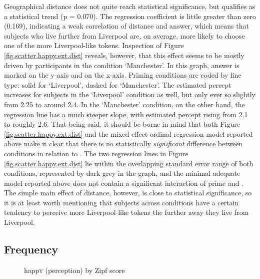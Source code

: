 Geographical distance does not quite reach statistical significance, but qualifies as a statistical trend (p = 0.070).
The regression coefficient is little greater than zero (0.169), indicating a weak correlation of distance and answer, which means that subjects who live further from Liverpool are, on average, more likely to choose one of the more Liverpool-like tokens.
Inspection of Figure \ref{fig.scatter.happy.ext.dist} reveals, however, that this effect seems to be mostly driven by participants in the  condition `Manchester'.
In this graph, answer is marked on the y-axis and  on the x-axis.
Priming conditions are coded by line type: solid for `Liverpool', dashed for `Manchester'.
The estimated percept increases for subjects in the `Liverpool' condition as well, but only ever so slightly from 2.25 to around 2.4.
In the `Manchester' condition, on the other hand, the regression line has a much steeper slope, with estimated percept rising from 2.1 to roughly 2.6.
That being said, it should be borne in mind that both Figure \ref{fig.scatter.happy.ext.dist} and the mixed effect ordinal regression model reported above make it clear that there is no statistically \emph{significant} difference between  conditions in relation to .
The two regression lines in Figure \ref{fig.scatter.happy.ext.dist} lie within the overlapping standard error range of both conditions, represented by dark grey in the graph, and the minimal adequate model reported above does not contain a significant interaction of prime and .
The simple main effect of distance, however, is close to statistical significance, so it is at least worth mentioning that subjects across conditions have a certain tendency to perceive more Liverpool-like tokens the further away they live from Liverpool.

\subsection{Frequency}
\label{sec.perc_res.happy.frequency}

\begin{figure}[h]
	\centering
		\resizebox{.49\linewidth}{!}{} 
	\caption{happ\textsc{y} (perception) by Zipf score}
	\label{fig.scatter.happy.ext.zipf}
\end{figure}

